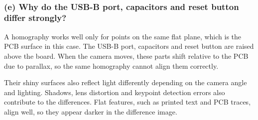 \documentclass[11pt]{article}
\begin{document}
    \begin{center}
    \end{center}
    { \hspace*{\fill} \\}
    
    \subsubsection{(e) Why do the USB-B port, capacitors and reset button
differ
strongly?}\label{e-why-do-the-usb-b-port-capacitors-and-reset-button-differ-strongly}

A homography works well only for points on the same flat plane, which is
the PCB surface in this case. The USB-B port, capacitors and reset
button are raised above the board. When the camera moves, these parts
shift relative to the PCB due to parallax, so the same homography cannot
align them correctly.

Their shiny surfaces also reflect light differently depending on the
camera angle and lighting. Shadows, lens distortion and keypoint
detection errors also contribute to the differences. Flat features, such
as printed text and PCB traces, align well, so they appear darker in the
difference image.


    
    
    
\end{document}
